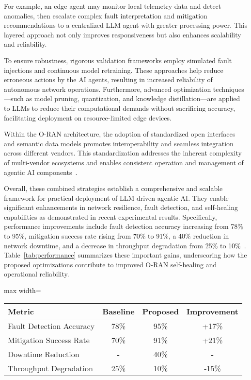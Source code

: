 \documentclass[sigconf]{acmart}
\begin{document}
For example, an edge agent may monitor local telemetry data and detect anomalies, then escalate complex fault interpretation and mitigation recommendations to a centralized LLM agent with greater processing power. This layered approach not only improves responsiveness but also enhances scalability and reliability.

To ensure robustness, rigorous validation frameworks employ simulated fault injections and continuous model retraining. These approaches help reduce erroneous actions by the AI agents, resulting in increased reliability of autonomous network operations. Furthermore, advanced optimization techniques—such as model pruning, quantization, and knowledge distillation—are applied to LLMs to reduce their computational demands without sacrificing accuracy, facilitating deployment on resource-limited edge devices.

Within the O-RAN architecture, the adoption of standardized open interfaces and semantic data models promotes interoperability and seamless integration across different vendors. This standardization addresses the inherent complexity of multi-vendor ecosystems and enables consistent operation and management of agentic AI components~\cite{ref55}.

Overall, these combined strategies establish a comprehensive and scalable framework for practical deployment of LLM-driven agentic AI. They enable significant enhancements in network resilience, fault detection, and self-healing capabilities as demonstrated in recent experimental results. Specifically, performance improvements include fault detection accuracy increasing from 78\% to 95\%, mitigation success rate rising from 70\% to 91\%, a 40\% reduction in network downtime, and a decrease in throughput degradation from 25\% to 10\%~\cite{ref55}. Table~\ref{tab:performance} summarizes these important gains, underscoring how the proposed optimizations contribute to improved O-RAN self-healing and operational reliability.

\begin{table*}[htbp]
\centering
\caption{Performance Improvements of LLM-Driven Agentic AI in O-RAN Self-Healing~\cite{ref55}}
\label{tab:performance}
\begin{adjustbox}{max width=\textwidth}
\begin{tabular}{@{}lccc@{}}
\toprule
Metric & Baseline & Proposed & Improvement \\ \midrule
Fault Detection Accuracy & 78\% & 95\% & +17\% \\
Mitigation Success Rate & 70\% & 91\% & +21\% \\
Downtime Reduction & - & 40\% & - \\
Throughput Degradation & 25\% & 10\% & -15\% \\ \bottomrule
\end{tabular}
\end{adjustbox}
\end{table*}
\end{document}
